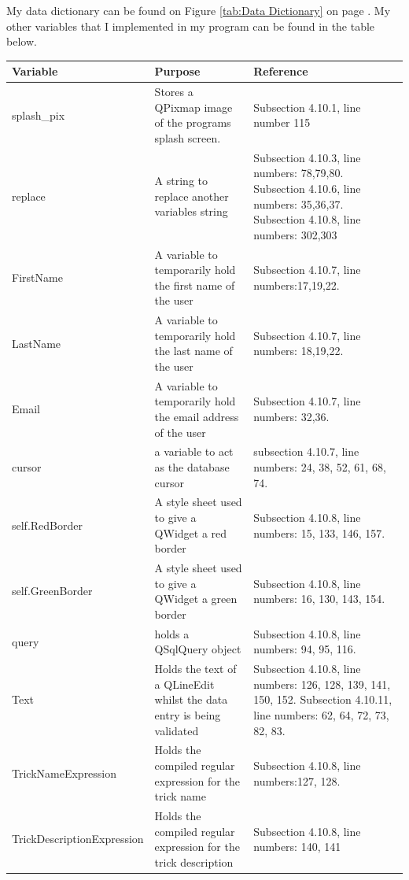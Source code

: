 My data dictionary can be found on Figure \ref{tab:Data Dictionary} on page \pageref{tab:Data Dictionary}. My other variables that I implemented in my program can be found in the table below.

\begin{center}
\begin{longtable}{|p{3.5cm}|p{6cm}|p{3.5cm}|} \hline
\textbf{Variable} & \textbf{Purpose} & \textbf{Reference} \\ \hline
splash\_pix & Stores a QPixmap image of the programs splash screen. & Subsection 4.10.1, line number 115 \\ \hline
replace & A string to replace another variables string & Subsection 4.10.3, line numbers: 78,79,80. Subsection 4.10.6, line numbers: 35,36,37. Subsection 4.10.8, line numbers: 302,303 \\ \hline
FirstName & A variable to temporarily hold the first name of the user & Subsection 4.10.7, line numbers:17,19,22. \\ \hline
LastName & A variable to temporarily hold the last name of the user & Subsection 4.10.7, line numbers: 18,19,22. \\ \hline
Email & A variable to temporarily hold the email address of the user & Subsection 4.10.7, line numbers: 32,36. \\ \hline
cursor & a variable to act as the database cursor & subsection 4.10.7, line numbers: 24, 38, 52, 61, 68, 74. \\ \hline
self.RedBorder & A style sheet used to give a QWidget a red border & Subsection 4.10.8, line numbers: 15, 133, 146, 157. \\ \hline
self.GreenBorder & A style sheet used to give a QWidget a green border & Subsection 4.10.8, line numbers: 16, 130, 143, 154. \\ \hline
query & holds a QSqlQuery object & Subsection 4.10.8, line numbers: 94, 95, 116. \\ \hline
Text & Holds the text of a QLineEdit whilst the data entry is being validated &Subsection 4.10.8, line numbers: 126, 128, 139, 141, 150, 152. Subsection 4.10.11, line numbers: 62, 64, 72, 73, 82, 83. \\ \hline
TrickNameExpression & Holds the compiled regular expression for the trick name & Subsection 4.10.8, line numbers:127, 128. \\ \hline
TrickDescriptionExpression & Holds the compiled regular expression for the trick description & Subsection 4.10.8, line numbers: 140, 141 \\ \hline

\end{longtable}
\end{center}
